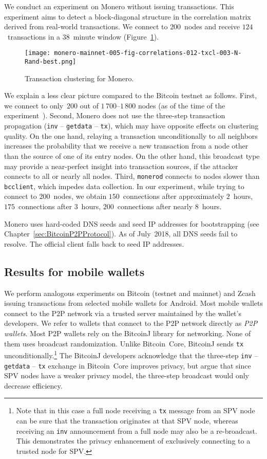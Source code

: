 We conduct an experiment on Monero without issuing transactions.
This experiment aims to detect a block-diagonal structure in the correlation matrix derived from real-world transactions.
We connect to $200$~nodes and receive $124$~transactions in a $38$~minute window (Figure~\ref{fig:monero}).

\begin{figure}[!t]
	\centering
	\texttt{[image: monero-mainnet-005-fig-correlations-012-txcl-003-N-Rand-best.png]}
	\caption{Transaction clustering for Monero.}
	\label{fig:monero}
\end{figure}

We explain a less clear picture compared to the Bitcoin testnet as follows.
First, we connect to only~$200$ out of $1\,700$--$1\,800$ nodes (as of the time of the experiment~\cite{MoneroHash}).
Second, Monero does not use the three-step transaction propagation (\texttt{inv} -- \texttt{getdata} -- \texttt{tx}), which may have opposite effects on clustering quality.
On the one hand, relaying a transaction unconditionally to all neighbors increases the probability that we receive a new transaction from a node other than the source of one of its entry nodes.
On the other hand, this broadcast type may provide a near-perfect insight into transaction sources, if the attacker connects to all or nearly all nodes.
Third, \texttt{monerod} connects to nodes slower than \texttt{bcclient}, which impedes data collection.
In our experiment, while trying to connect to $200$~nodes, we obtain $150$~connections after approximately $2$~hours, $175$~connections after $3$~hours, $200$~connections after nearly $8$~hours.

Monero uses hard-coded DNS seeds and seed IP addresses for bootstrapping (see Chapter~\ref{sec:BitcoinP2PProtocol}).
As of July~2018, all DNS seeds fail to resolve.
The official client falls back to seed IP addresses.


\subsection{Results for mobile wallets}

We perform analogous experiments on Bitcoin (testnet and mainnet) and Zcash issuing transactions from selected mobile wallets for Android.
Most mobile wallets connect to the P2P network via a trusted server maintained by the wallet's developers.
We refer to wallets that connect to the P2P network directly as \textit{P2P wallets}.
Most P2P wallets rely on the BitcoinJ library for networking.
None of them uses broadcast randomization.
Unlike Bitcoin~Core, BitcoinJ sends \texttt{tx} unconditionally.\footnote{Note that in this case a full node receiving a \texttt{tx} message from an SPV node can be sure that the transaction originates at that SPV node, whereas receiving an \texttt{inv} announcement from a full node may also be a re-broadcast. This demonstrates the privacy enhancement of exclusively connecting to a trusted node for SPV.}
The BitcoinJ developers acknowledge that the three-step \texttt{inv} -- \texttt{getdata} -- \texttt{tx} exchange in Bitcoin~Core improves privacy, but argue that since SPV nodes have a weaker privacy model, the three-step broadcast would only decrease efficiency.

